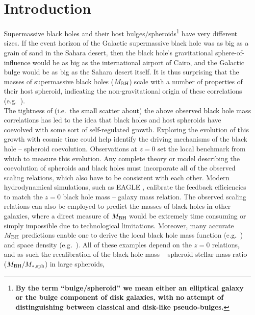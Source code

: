\documentclass[preprint2]{emulateapj}
\begin{document}
\section{Introduction}
\label{sec:int}
Supermassive black holes and their host bulges/spheroids\footnote{\bf By the term ``bulge/spheroid'' 
we mean either an elliptical galaxy or the bulge component of disk galaxies, 
with no attempt of distinguishing between classical and disk-like pseudo-bulges. } 
have very different sizes. 
If the event horizon of the Galactic supermassive black hole was as big as a grain of sand in the Sahara desert, 
then the black hole's gravitational sphere-of-influence would be as big as the international airport of Cairo, 
and the Galactic bulge would be as big as the Sahara desert itself.
It is thus surprising that the masses of supermassive black holes ($M_{\rm BH}$) 
scale with a number of properties of their host spheroid, 
indicating the non-gravitational origin of these correlations 
(e.g.~\citealt{dressler1989,yee1992,kormendyrichstone1995,laor1997,magorrian1998,ferraresemerritt2000,gebhardt2000,graham2001,
marconihunt2003,haringrix2004,grahamscott2015}). \\
The tightness of (i.e.~the small scatter about) the above observed black hole mass correlations has led to the idea
that black holes and host spheroids have coevolved with some sort of self-regulated growth.
Exploring the evolution of this growth with cosmic time could help identify
the driving mechanisms of the black hole -- spheroid coevolution.
Observations at $z=0$ set the local benchmark from which to measure this evolution.
Any complete theory or model describing the coevolution of spheroids and black holes must incorporate 
all of the observed scaling relations, which also have to be consistent with each other.
Modern hydrodynamical simulations, such as EAGLE \citep{schaye2015}, calibrate the feedback efficiencies 
to match the $z=0$ black hole mass -- galaxy mass relation.
The observed scaling relations can also be employed to predict the masses of black holes in other galaxies, where a direct
measure of $M_{\rm BH}$ would be extremely time consuming or simply impossible due to technological limitations.
Moreover, many accurate $M_{\rm BH}$ predictions enable one to derive 
the local black hole mass function (e.g.~\citealt{salucci1999,graham2007smbhmassfunction,shankar2009,shankar2013,fontanot2015}) 
and space density (e.g.~\citealt{grahamdriver2007smbhmassdensity,comastri2015}). 
All of these examples depend on the $z=0$ relations, 
and as such the recalibration of the black hole mass -- spheroid stellar mass ratio ($M_{\rm BH}/M_{\rm *,sph}$) in large spheroids,
\end{document}
